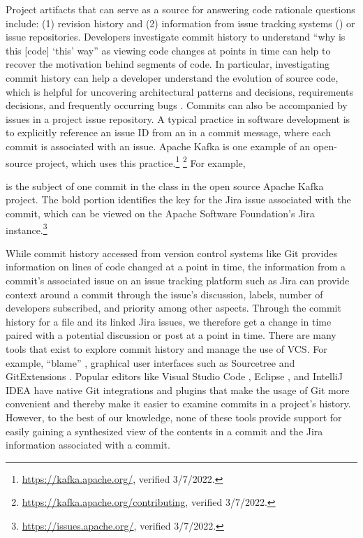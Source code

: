 Project artifacts that can serve as a source for answering code rationale questions include: (1) revision history and (2) information from issue tracking systems () or issue repositories. 
Developers investigate commit history to understand ``why is this [code] ‘this’ way'' as viewing code changes at points in time can help to recover the motivation behind segments of code.
In particular, investigating commit history can help a developer understand the evolution of source code, which is helpful for uncovering architectural patterns and decisions, requirements decisions, and frequently occurring bugs \cite{codoban_software_2015}.
Commits can also be accompanied by issues in a project issue repository. 
A typical practice in software development is to explicitly reference an issue ID from an  in a commit message, where each commit is associated with an issue. Apache Kafka is one example of an open-source project, which uses this practice.\footnote{\url{https://kafka.apache.org/}, verified 3/7/2022.} \footnote{\url{https://kafka.apache.org/contributing}, verified 3/7/2022.}
For example, 

\begin{center}
\end{center}

is the subject of one commit in the  class in the open source Apache Kafka project. The bold portion identifies the key for the Jira issue associated with the commit, which can be viewed on the Apache Software Foundation's Jira instance.\footnote{\url{https://issues.apache.org/}, verified 3/7/2022.}

While commit history accessed from version control systems like Git provides information on lines of code changed at a point in time, the information from a commit's associated issue on an issue tracking platform such as Jira \cite{jira} can provide context around a commit through the issue's discussion, labels, number of developers subscribed, and priority among other aspects.
Through the commit history for a file and its linked Jira issues, we therefore get a change in time paired with a potential discussion or post at a point in time.
There are many tools that exist to explore commit history and manage the use of VCS. 
For example,  ``blame'' \cite{gitblame}, graphical user interfaces such as Sourcetree \cite{sourcetree} and GitExtensions \cite{gitextensions}. 
Popular editors like Visual Studio Code \cite{vscode}, Eclipse \cite{eclipse}, and IntelliJ IDEA \cite{intellij} have native Git integrations and plugins that make the usage of Git more convenient and thereby make it easier to examine commits in a project's history. 
However, to the best of our knowledge, none of these tools provide support for easily gaining a synthesized view of the contents in a commit and the Jira information associated with a commit.

